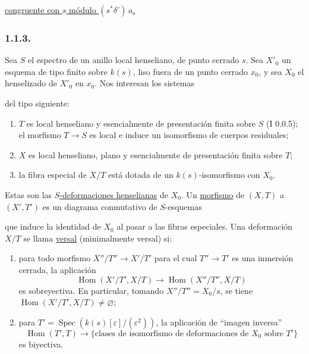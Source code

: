 \pageoriginale

\underline{congruente con $s$ módulo $(s^*\delta')\,a$.}

\subsubsection*{1.1.3.}
Sea $S$ el espectro de un anillo local henseliano, de punto cerrado
$s$. Sea $X'_0$ un esquema de tipo finito sobre $k(s)$, liso fuera de
un punto cerrado $x_0$, y sea $X_0$ el henselizado de $X'_0$ en $x_0$.
Nos interesan los sistemas
\begin{center}
\end{center}
del tipo siguiente:
\begin{enumerate}[label=(\alph*),leftmargin=2.6em]
\item $T$ es local henseliano y esencialmente de presentación finita
sobre $S$ (I 0.0.5); el morfismo $T\to S$ es local e induce un
isomorfismo de cuerpos residuales;

\item $X$ es local henseliano, plano y esencialmente de presentación
finita sobre $T$;

\item la fibra especial de $X/T$ está dotada de un $k(s)$-isomorfismo
con $X_0$.
\end{enumerate}
Estas son las \underline{$S$-deformaciones henselianas} de $X_0$. Un
\underline{morfismo} de $(X,T)$ a $(X',T')$ es un diagrama conmutativo
de $S$-esquemas
\begin{center}
\end{center}
que induce la identidad de $X_0$ al pasar a las fibras especiales. Una
deformación $X/T$ se llama \underline{versal} (minimalmente versal) si:
\begin{enumerate}[label=(\alph*),leftmargin=2.6em]
\item para todo morfismo $X''/T''\longrightarrow X'/T'$ para el cual
$T''\to T'$ es una inmersión cerrada, la aplicación
\[
\operatorname{Hom}(X'/T',X/T)
\longrightarrow\operatorname{Hom}(X''/T'',X/T)
\]
es sobreyectiva. En particular, tomando $X''/T''=X_0/s$, se tiene
$\operatorname{Hom}(X'/T',X/T)\ne\varnothing$;

\item para $T'=\operatorname{Spec}(k(s)[\varepsilon]/(\varepsilon^2))$,
la aplicación de ``imagen inversa''
\[
\operatorname{Hom}(T',T)\longrightarrow
\{\text{clases de isomorfismo de deformaciones de $X_0$ sobre $T'$}\}
\]
es biyectiva.
\end{enumerate}

